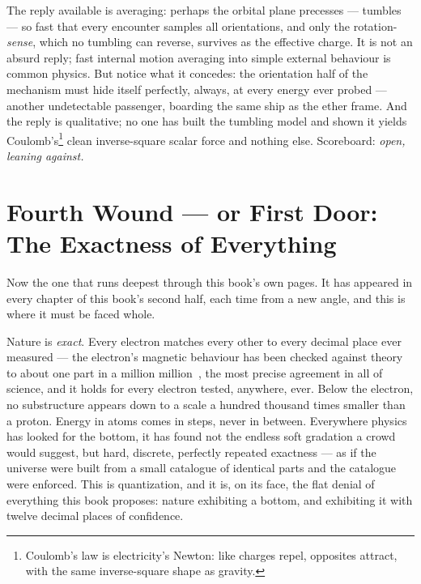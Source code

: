\documentclass[fontsize=11pt,paper=a4,pagesize=auto,parskip=half-]{scrbook}
\begin{document}
The reply available is averaging: perhaps the orbital plane precesses --- tumbles --- so fast that every encounter samples all orientations, and only the rotation-\emph{sense}, which no tumbling can reverse, survives as the effective charge. It is not an absurd reply; fast internal motion averaging into simple external behaviour is common physics. But notice what it concedes: the orientation half of the mechanism must hide itself perfectly, always, at every energy ever probed --- another undetectable passenger, boarding the same ship as the ether frame. And the reply is qualitative; no one has built the tumbling model and shown it yields Coulomb's\footnote{Coulomb's law is electricity's Newton: like charges repel, opposites attract, with the same inverse-square shape as gravity.} clean inverse-square scalar force and nothing else. Scoreboard: \emph{open, leaning against.}

\section{Fourth Wound --- or First Door: The Exactness of Everything}

Now the one that runs deepest through this book's own pages. It has appeared in every chapter of this book's second half, each time from a new angle, and this is where it must be faced whole.

Nature is \emph{exact}. Every electron matches every other to every decimal place ever measured --- the electron's magnetic behaviour has been checked against theory to about one part in a million million~\cite{fan2023}, the most precise agreement in all of science, and it holds for every electron tested, anywhere, ever. Below the electron, no substructure appears down to a scale a hundred thousand times smaller than a proton. Energy in atoms comes in steps, never in between. Everywhere physics has looked for the bottom, it has found not the endless soft gradation a crowd would suggest, but hard, discrete, perfectly repeated exactness --- as if the universe were built from a small catalogue of identical parts and the catalogue were enforced. This is quantization, and it is, on its face, the flat denial of everything this book proposes: nature exhibiting a bottom, and exhibiting it with twelve decimal places of confidence.
\end{document}
